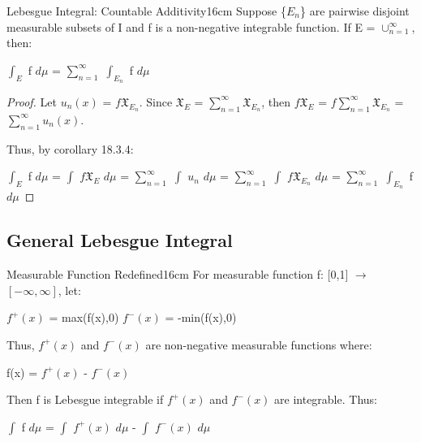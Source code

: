     \vspace{0.5cm}



    \begin{corollary}{Lebesgue Integral: Countable Additivity}{16cm}
        Suppose \{$E_n$\} are pairwise disjoint measurable subsets of I
        and f is a non-negative integrable function.
        If E = $\cup_{n=1}^{\infty}$, then:

        \hspace{0.5cm}
        $\int_E$ f $d\mu$
        = $\sum_{n=1}^{\infty}$ $\int_{E_n}$ f $d\mu$
    \end{corollary}

    \begin{proof}
        Let $u_n(x)$ = $f \mathfrak{X}_{E_n}$.
        Since $\mathfrak{X}_E$ = $\sum_{n=1}^{\infty} \mathfrak{X}_{E_n}$, then
        $f \mathfrak{X}_E$
        = $f \sum_{n=1}^{\infty} \mathfrak{X}_{E_n}$
        = $\sum_{n=1}^{\infty} u_n(x)$.

        Thus, by {\color{orange} corollary 18.3.4}:

        \hspace{0.5cm}
        $\int_E$ f $d\mu$
        = $\int$ $f \mathfrak{X}_E$ $d\mu$
        = $\sum_{n=1}^{\infty}$ $\int$ $u_n$ $d\mu$
        = $\sum_{n=1}^{\infty}$ $\int$ $f \mathfrak{X}_{E_n}$ $d\mu$
        = $\sum_{n=1}^{\infty}$ $\int_{E_n}$ f $d\mu$
    \end{proof}

    \newpage





\subsection{ General Lebesgue Integral }

    \begin{definition}{Measurable Function Redefined}{16cm}
        For measurable function f: [0,1] $\rightarrow$ $[-\infty,\infty]$, let:
        
        \hspace{0.5cm}
        $f^+(x)$ = max(f(x),0)
        \hspace{1cm}
        $f^-(x)$ = -min(f(x),0)

        Thus, $f^+(x)$ and $f^-(x)$ are non-negative measurable functions where:
        
        \hspace{0.5cm}
        f(x) = $f^+(x)$ - $f^-(x)$

        Then f is Lebesgue integrable if $f^+(x)$ and $f^-(x)$ are integrable.
        Thus:

        \hspace{0.5cm}
        $\int$ f $d\mu$
        = $\int$ $f^+(x)$ $d\mu$ - $\int$ $f^-(x)$ $d\mu$
    \end{definition}

